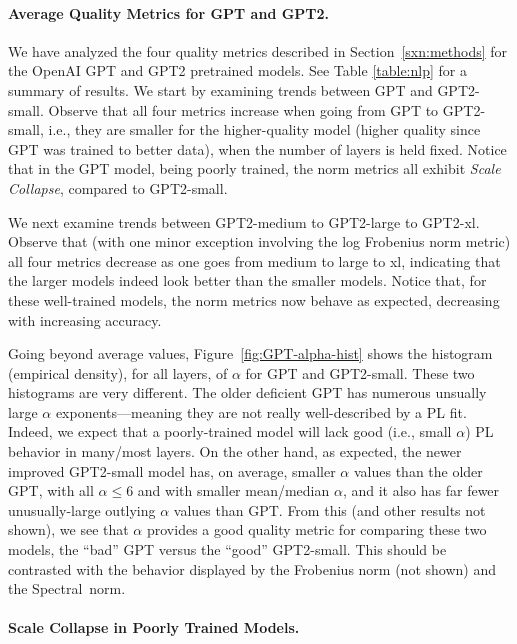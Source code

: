 \paragraph{Average Quality Metrics for GPT and GPT2.}

We have analyzed the four quality metrics described in Section~\ref{sxn:methods} for the OpenAI GPT and GPT2 pretrained models.
See Table \ref{table:nlp} for a summary of results.
We start by examining trends between GPT and GPT2-small.
Observe that all four metrics increase when going from GPT to GPT2-small, i.e., they are smaller for the higher-quality model (higher quality since GPT was trained to better data), when the number of layers is held fixed.
Notice that in the GPT model, being poorly trained, the norm metrics all exhibit \emph{Scale Collapse}, compared to GPT2-small.

We next examine trends between GPT2-medium to GPT2-large to GPT2-xl.
Observe that (with one minor exception involving the log Frobenius norm metric) all four metrics decrease as one goes from medium to large to xl, indicating that the larger models indeed look better than the smaller models.
Notice that, for these well-trained models, the norm metrics now behave as expected, decreasing with increasing accuracy.

Going beyond average values, Figure~\ref{fig:GPT-alpha-hist} shows the histogram (empirical density), for all layers, of $\alpha$ for GPT and GPT2-small.  
These two histograms are very different.
The older deficient GPT has numerous unsually large $\alpha$ exponents---meaning they are not really well-described by a PL fit.
Indeed, we expect that a poorly-trained model will lack good (i.e., small $\alpha$) PL behavior in many/most layers.
On the other hand, as expected, the newer improved GPT2-small model has, on average, smaller $\alpha$ values than the older GPT, with all $\alpha\le6$ and with smaller mean/median $\alpha$, and it also has far fewer unusually-large outlying $\alpha$ values than GPT.
From this (and other results not shown), we see that $\alpha$ provides a good quality metric for comparing these two models, the ``bad'' GPT versus the ``good'' GPT2-small.
%
This should be contrasted with the behavior displayed by the Frobenius norm (not shown) and the Spectral~norm.


\paragraph{Scale Collapse in Poorly Trained Models.}

